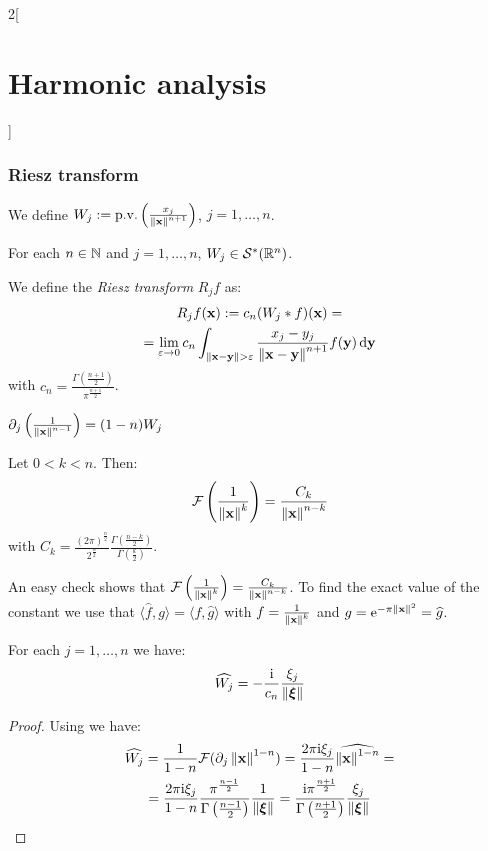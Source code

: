\documentclass[../../../main_math.tex]{subfiles}
\begin{document}
\begin{multicols}{2}[\section{Harmonic analysis}]
  \subsubsection{Riesz transform}
  \begin{definition}
    We define $W_j:=\mathrm{p.v.}\left(\frac{x_j}{\left\|\boldsymbol{\mathrm{x}}\right\|^{n+1}}\right)$, $j=1,\ldots,n$.
  \end{definition}
  \begin{lemma}
    For each $n\in\mathbb{N}$ and $j=1,\ldots,n$, $W_j\in\mathcal{S}^*(\mathbb{R}^n)$.
  \end{lemma}
  \begin{definition}
    We define the \emph{Riesz transform} $R_jf$ as:
    \begin{multline*}
      R_jf(\boldsymbol{\mathrm{x}}):=c_n(W_j*f)(\boldsymbol{\mathrm{x}})=\\=\lim_{\varepsilon\to 0}c_n\int_{\left\|\boldsymbol{\mathrm{x}}-\boldsymbol{\mathrm{y}}\right\| > \varepsilon}\frac{x_j-y_j}{\left\|\boldsymbol{\mathrm{x}}-\boldsymbol{\mathrm{y}}\right\|^{n+1}}f(\boldsymbol{\mathrm{y}})\dd{\boldsymbol{\mathrm{y}}}
    \end{multline*}
    with $c_n=\frac{\Gamma\left(\frac{n+1}{2}\right)}{\pi^{\frac{n+1}{2}}}$.
  \end{definition}
  \begin{lemma}\label{lem:preRiesz1}
    $\partial_j\left(\frac{1}{\left\|\boldsymbol{\mathrm{x}}\right\|^{n-1}}\right)=(1-n)W_j$
  \end{lemma}
  \begin{lemma}\label{lem:preRiesz2}
    Let $0<k<n$. Then: $$\mathcal{F}\left(\frac{1}{\left\|\boldsymbol{\mathrm{x}}\right\|^k}\right)=\frac{C_k}{\left\|\boldsymbol{\mathrm{x}}\right\|^{n-k}}$$
    with $C_k=\frac{{(2\pi)}^{\frac{n}{2}}}{{2}^{\frac{\alpha}{2}}}\frac{\Gamma\left(\frac{n-k}{2}\right)}{\Gamma\left(\frac{k}{2}\right)}$.
  \end{lemma}
  \begin{sproof}
    An easy check shows that $\mathcal{F}\left(\frac{1}{\left\|\boldsymbol{\mathrm{x}}\right\|^k}\right)=\frac{C_k}{\left\|\boldsymbol{\mathrm{x}}\right\|^{n-k}}$. To find the exact value of the constant we use that $\langle \widehat{f}, g\rangle = \langle f, \widehat{g}\rangle$ with $f=\frac{1}{\left\|\boldsymbol{\mathrm{x}}\right\|^k}$ and $g=\mathrm{e}^{-\pi\left\|\boldsymbol{\mathrm{x}}\right\|^2}=\widehat{g}$.
  \end{sproof}
  \begin{theorem}
    For each $j=1, \ldots, n$ we have: $$\widehat{W_j}=-\frac{\mathrm{i}}{c_n}\frac{\xi_j}{\left\|\boldsymbol{\mathrm{\xi}}\right\|}$$
  \end{theorem}
  \begin{proof}
    Using  we have:
    \begin{multline*}
      \widehat{W_j}=\frac{1}{1-n}\F{(\partial_j\norm{\vf{x}}^{1-n})}=\frac{2\pi\ii\xi_j}{1-n} \widehat{\norm{\vf{x}}^{1-n}}=\\=\frac{2\pi\ii\xi_j}{1-n}\frac{\pi^{\frac{n-1}{2}}}{\Gamma\left(\frac{n-1}{2}\right)}\frac{1}{\norm{\vf{\xi}}}=\frac{\ii\pi^{\frac{n+1}{2}}}{\Gamma\left(\frac{n+1}{2}\right)}\frac{\xi_j}{\norm{\vf{\xi}}}

\end{multline*}
\end{proof}
\end{multicols}
\end{document}
